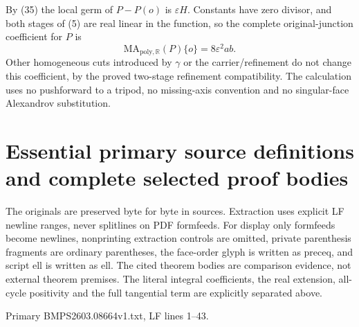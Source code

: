 \documentclass[
  11pt,
]{article}
\begin{document}
By (35) the local germ of \(P-P(o)\) is \(\varepsilon H\). Constants
have zero divisor, and both stages of (5) are real linear in the
function, so the complete original-junction coefficient for \(P\) is \[
                    \mathrm{MA}_{\mathrm{poly},\mathbb{R}}(P)\{o\}
                                  =8\varepsilon^2ab.          \tag{47}
\] Other homogeneous cuts introduced by \(\gamma\) or the
carrier/refinement do not change this coefficient, by the proved
two-stage refinement compatibility. The calculation uses no pushforward
to a tripod, no missing-axis convention and no singular-face Alexandrov
substitution.

\section{Essential primary source definitions and complete selected
proof
bodies}\label{essential-primary-source-definitions-and-complete-selected-proof-bodies}

The originals are preserved byte for byte in sources. Extraction uses
explicit LF newline ranges, never splitlines on PDF formfeeds. For
display only formfeeds become newlines, nonprinting extraction controls
are omitted, private parenthesis fragments are ordinary parentheses, the
face-order glyph is written as preceq, and script ell is written as ell.
The cited theorem bodies are comparison evidence, not external theorem
premises. The literal integral coefficients, the real extension,
all-cycle positivity and the full tangential term are explicitly
separated above.

Primary BMPS2603.08664v1.txt, LF lines 1--43.
\end{document}
